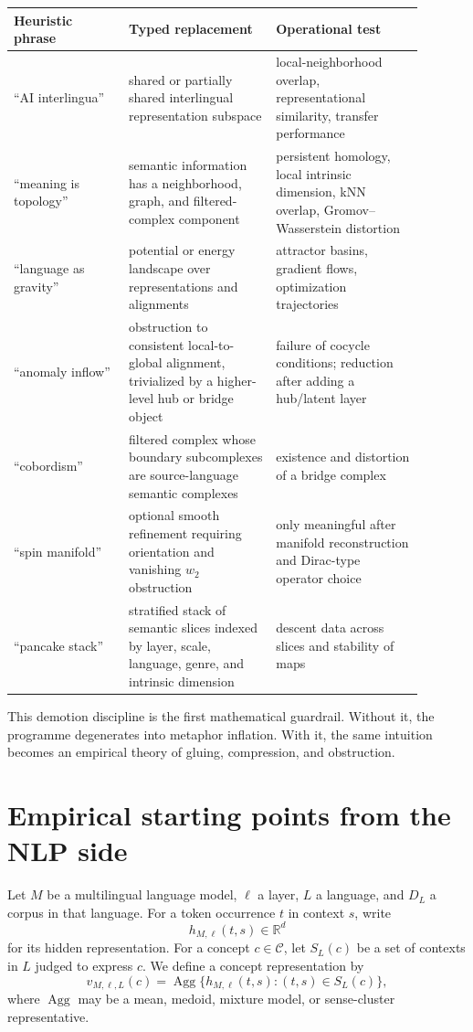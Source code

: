 \documentclass[11pt]{article}
\newcommand{\Concept}{\mathcal C}
\newcommand{\R}{\mathbb R}
\begin{document}
\begin{center}
\begin{tabular}{p{0.25\linewidth}p{0.32\linewidth}p{0.32\linewidth}}
\toprule
Heuristic phrase & Typed replacement & Operational test \\
\midrule
``AI interlingua'' & shared or partially shared interlingual representation subspace & local-neighborhood overlap, representational similarity, transfer performance \\
``meaning is topology'' & semantic information has a neighborhood, graph, and filtered-complex component & persistent homology, local intrinsic dimension, kNN overlap, Gromov--Wasserstein distortion \\
``language as gravity'' & potential or energy landscape over representations and alignments & attractor basins, gradient flows, optimization trajectories \\
``anomaly inflow'' & obstruction to consistent local-to-global alignment, trivialized by a higher-level hub or bridge object & failure of cocycle conditions; reduction after adding a hub/latent layer \\
``cobordism'' & filtered complex whose boundary subcomplexes are source-language semantic complexes & existence and distortion of a bridge complex \\
``spin manifold'' & optional smooth refinement requiring orientation and vanishing $w_2$ obstruction & only meaningful after manifold reconstruction and Dirac-type operator choice \\
``pancake stack'' & stratified stack of semantic slices indexed by layer, scale, language, genre, and intrinsic dimension & descent data across slices and stability of maps \\
\bottomrule
\end{tabular}
\end{center}

This demotion discipline is the first mathematical guardrail.  Without it, the programme degenerates into metaphor inflation.  With it, the same intuition becomes an empirical theory of gluing, compression, and obstruction.

\section{Empirical starting points from the NLP side}

Let $M$ be a multilingual language model, $\ell$ a layer, $L$ a language, and $D_L$ a corpus in that language.  For a token occurrence $t$ in context $s$, write
\[
  h_{M,\ell}(t,s)\in\R^d
\]
for its hidden representation.  For a concept $c\in\Concept$, let $S_L(c)$ be a set of contexts in $L$ judged to express $c$.  We define a concept representation by
\[
  v_{M,\ell,L}(c)=\operatorname{Agg}\{h_{M,\ell}(t,s): (t,s)\in S_L(c)\},
\]
where $\operatorname{Agg}$ may be a mean, medoid, mixture model, or sense-cluster representative.
\end{document}
